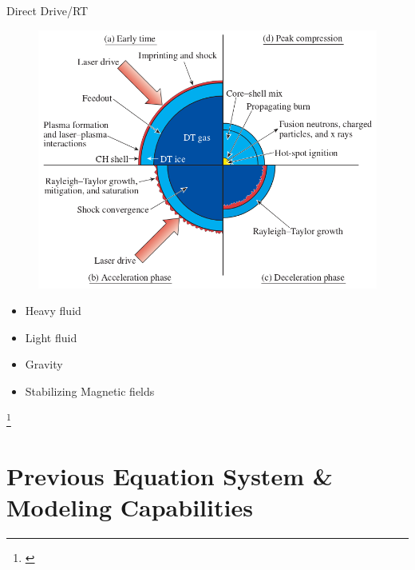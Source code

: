 \begin{frame}[t, label=current]{Direct Drive/RT}
  \minipage{\textwidth}
  \begin{figure}[!htbp]
   \includegraphics[width=1.0\linewidth]{../fig/DDfusion}
   \centering
  \end{figure}

  \endminipage\hfill
  \begin{itemize}
    \item Heavy fluid 
    \item Light fluid
    \item Gravity 
    \item Stabilizing Magnetic fields
  \end{itemize}

  \endminipage\hfill
  \endminipage


  \vspace{-0.5cm}

 \footnote{\cite{craxton2015}}


\end{frame}


\section{Previous Equation System \& Modeling Capabilities}

